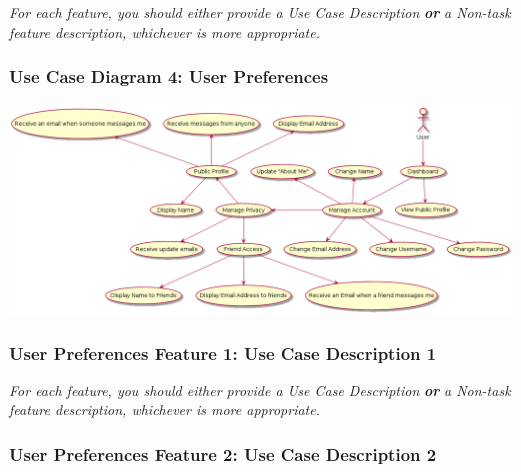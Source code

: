 \documentclass[twoside,letterpaper]{article}
\begin{document}
{\color{black}
	\foreignlanguage{english}{\textit{For each feature, you should either provide a Use Case Description
		}}\foreignlanguage{english}{\textbf{\textit{or}}}\foreignlanguage{english}{\textit{ a Non-task feature description,
		whichever is more appropriate.}}}
\newpage

\subsubsection[Use Case Diagram 4: User Preferences]{\rmfamily\bfseries\color{black}
	Use Case Diagram 4: User Preferences}

\includegraphics[width=\textwidth]{images/UseCaseDiagrams/UserPreferences}

\newpage

\subsubsection[User Preferences Feature 1: Use Case Description 1]{\rmfamily\bfseries\color{black}
	User Preferences Feature 1: Use Case Description 1}
\hypertarget{RefHeading22059017292}{}
\bigskip

{\color{black}
	\foreignlanguage{english}{\textit{For each feature, you should either provide a Use Case Description
		}}\foreignlanguage{english}{\textbf{\textit{or}}}\foreignlanguage{english}{\textit{ a Non-task feature description,
		whichever is more appropriate.}}}
\newpage

\subsubsection[User Preferences Feature 2: Use Case Description 2]{\rmfamily\bfseries\color{black}
	User Preferences Feature 2: Use Case Description 2}
\hypertarget{RefHeading22059017292}{}
\bigskip
\end{document}
